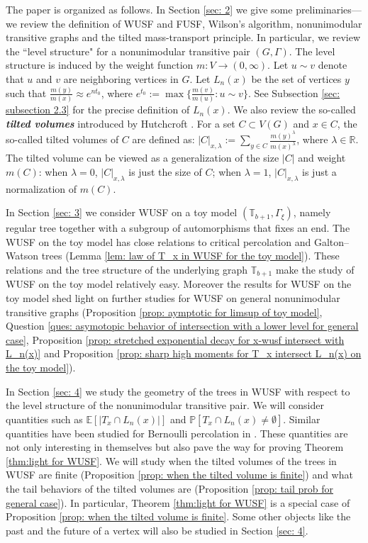 \documentclass[12pt]{article}
\numberwithin{equation}{section}
\newcommand{\1}{\mathbf{1}}
\newcommand{\notion}[1]{{\bf  \textit{#1}}}
\begin{document}
 The paper is organized as follows. In Section \ref{sec: 2} we give some preliminaries---we review the definition of WUSF and FUSF, Wilson's algorithm, nonunimodular transitive graphs and the tilted mass-transport principle. In particular, we review the ``level structure" for a nonunimodular transitive pair $(G,\Gamma)$. The level structure is induced by the weight function $m:V\rightarrow (0,\infty)$. Let $u\sim v$ denote that $u$ and $v$ are neighboring vertices in $G$. Let $L_n(x)$ be the set of vertices $y$ such that $\frac{m(y)}{m(x)}\approx e^{nt_0}$, where $e^{t_0}:=\max\{\frac{m(v)}{m(u)}\colon u\sim v \}$. See Subsection \ref{sec: subsection 2.3} for the precise definition of $L_n(x)$.  We also review the so-called \notion{tilted volumes} introduced by  Hutchcroft \cite{Tom2017}. For a set  $C\subset V(G)$ and $x\in C$, the so-called tilted volumes of $C$ are defined as: $|C|_{x,\lambda}:=\sum_{y\in C}{\frac{m(y)^\lambda}{m(x)^{\lambda}}}$, where $\lambda\in \mathbb{R}$. The tilted volume can be viewed as a generalization of the size $|C|$ and weight $m(C)$: when $\lambda=0$, $|C|_{x,\lambda}$ is just the size of $C$; when $\lambda=1$, $|C|_{x,\lambda}$ is just a normalization of $m(C)$.
 
 
  In Section \ref{sec: 3} we consider WUSF on a toy model $(\mathbb{T}_{b+1},\Gamma_{\xi})$, namely regular tree together with a subgroup of automorphisms that fixes an end. 
  The WUSF on the toy model has close relations to critical percolation and Galton--Watson trees (Lemma \ref{lem: law of T_x in WUSF for the toy model}). These relations and the tree structure of the underlying graph $\mathbb{T}_{b+1}$ make the study of  WUSF on the toy model relatively easy. Moreover the results for WUSF on the toy model shed light on further studies for WUSF on general nonunimodular transitive graphs (Proposition \ref{prop: aymptotic for limsup of toy model}, Question \ref{ques: asymotopic behavior of intersection with a lower level for general case}, Proposition \ref{prop: stretched exponential decay for x-wusf intersect with L_n(x)} and Proposition \ref{prop: sharp high moments for T_x intersect L_n(x) on the toy model}). 
  
   
  
  
  In Section \ref{sec: 4} we study the geometry of the trees in WUSF with respect to the level structure of the nonunimodular transitive pair. 
  We will consider quantities such as $\mathbb{E}[|T_x\cap L_n(x)|]$ and $\mathbb{P}[T_x\cap L_n(x)\neq \emptyset]$. Similar quantities have been studied for Bernoulli percolation in \cite{Tom2017}. These quantities are not only interesting in themselves but also pave the way for proving Theorem \ref{thm:light for WUSF}. We will study when the tilted volumes of the trees in WUSF are finite (Proposition \ref{prop: when the tilted volume is finite}) and what the tail behaviors of the tilted volumes are (Proposition \ref{prop: tail prob for general case}). In particular, Theorem \ref{thm:light for WUSF} is a special case of Proposition \ref{prop: when the tilted volume is finite}.
  Some other objects like the past and the future of a vertex will also be studied in Section \ref{sec: 4}.
  
\end{document}

